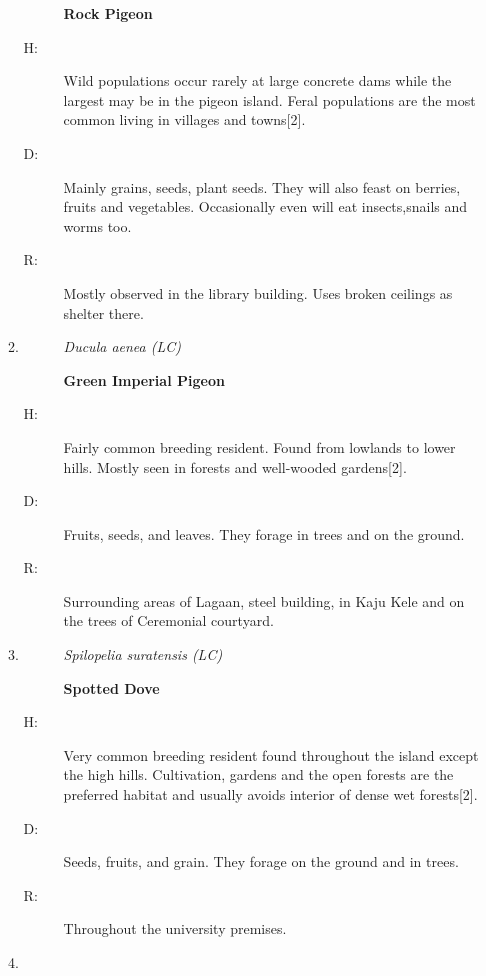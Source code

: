 \begin{itemize}
\begin{enumerate}
\begin{description}
\textbf{Rock Pigeon}%
\end{description}%
\begin{description}%
\item[H: ]%
Wild populations occur rarely at large concrete dams while the largest may be in the pigeon island. Feral populations are the most common living in villages and towns{[}2{]}.%
\item[D: ]%
Mainly grains, seeds, plant seeds. They will also feast on berries, fruits and vegetables. Occasionally even will eat insects,snails and worms too.%
\item[R: ]%
Mostly observed in the library building. Uses broken ceilings as shelter there.%
\end{description}%
\item%
\begin{description}%
\item[]%
\textit{Ducula aenea (LC)}%
\item[]%
\textbf{Green Imperial Pigeon}%
\end{description}%
\begin{description}%
\item[H: ]%
Fairly common breeding resident. Found from lowlands to lower hills. Mostly seen in forests and well{-}wooded gardens{[}2{]}.%
\item[D: ]%
Fruits, seeds, and leaves. They forage in trees and on the ground.%
\item[R: ]%
Surrounding areas of Lagaan, steel building, in Kaju Kele and on the trees of Ceremonial courtyard.%
\end{description}%
\item%
\begin{description}%
\item[]%
\textit{Spilopelia suratensis (LC)}%
\item[]%
\textbf{Spotted Dove}%
\end{description}%
\begin{description}%
\item[H: ]%
Very common breeding resident found throughout the island except the high hills. Cultivation, gardens and the open forests are the preferred habitat and usually avoids interior of dense wet forests{[}2{]}.%
\item[D: ]%
Seeds, fruits, and grain. They forage on the ground and in trees.%
\item[R: ]%
Throughout the university premises.%
\end{description}%
\item%

\end{enumerate}
\end{itemize}

